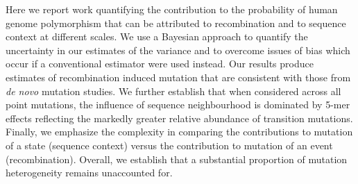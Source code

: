 Here we report work quantifying the contribution to the probability of human genome polymorphism that can be attributed to recombination and to sequence context at different scales. We use a Bayesian approach to quantify the uncertainty in our estimates of the variance and to overcome issues of bias which occur if a conventional estimator were used instead. Our results produce estimates of recombination induced mutation that are consistent with those from \textit{de novo} mutation studies. We further establish that when considered across all point mutations, the influence of sequence neighbourhood is dominated by 5-mer effects reflecting the markedly greater relative abundance of transition mutations. Finally, we emphasize the complexity in comparing the contributions to mutation of a state (sequence context) versus the contribution to mutation of an event (recombination).  Overall, we establish that a substantial proportion of mutation heterogeneity remains unaccounted for.